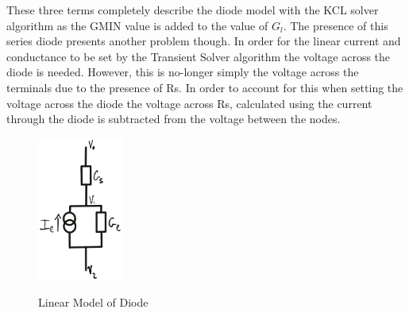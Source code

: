 \documentclass{article}
\begin{document}
These three terms completely describe the diode model with the KCL solver algorithm as the GMIN value is added to the value of $G_l$. The presence of this series diode presents another problem though. In order for the linear current and conductance to be set by the Transient Solver algorithm the voltage across the diode is needed. However, this is no-longer simply the voltage across the terminals due to the presence of Rs. In order to account for this when setting the voltage across the diode the voltage across Rs, calculated using the current through the diode is subtracted from the voltage between the nodes. 
\begin{figure}[h]
    \caption{Linear Model of Diode}
    \centering
    \includegraphics[width=0.25\textwidth]{images/DiodeCircuit.png}
    \label{fig:diode}
\end{figure}

\newpage
\end{document}
